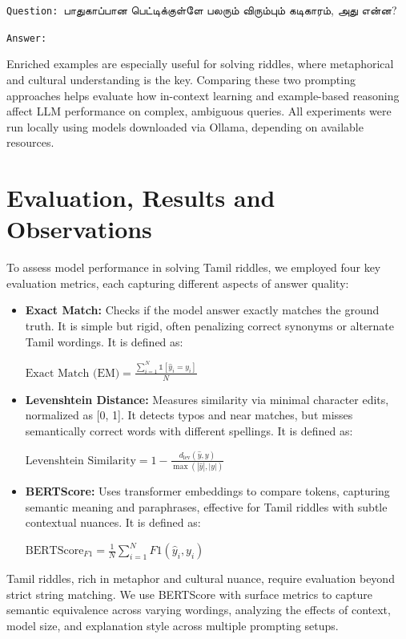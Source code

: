 \documentclass[11pt]{article}
\begin{document}
\texttt{Question: }{\tam பாதுகாப்பான பெட்டிக்குள்ளே பலரும்‌ விரும்பும்‌ கடிகாரம், அது என்ன?} 

\texttt{Answer:}

Enriched examples are especially useful for solving riddles, where metaphorical and cultural understanding is the key. Comparing these two prompting approaches helps evaluate how in-context learning and example-based reasoning affect LLM performance on complex, ambiguous queries. All experiments were run locally using models downloaded via Ollama, depending on available resources.

\section{Evaluation, Results and Observations}
To assess model performance in solving Tamil riddles, we employed four key evaluation metrics, each capturing different aspects of answer quality:

\begin{itemize}
\item \textbf{Exact Match:}  
Checks if the model answer exactly matches the ground truth. It is simple but rigid, often penalizing correct synonyms or alternate Tamil wordings.
It is defined as:

$\text{Exact Match (EM)} = \frac{\sum_{i=1}^{N} \mathbb{1}[\hat{y}_i = y_i]}{N}$

\item \textbf{Levenshtein Distance:}  
Measures similarity via minimal character edits, normalized as [0, 1]. It detects typos and near matches, but misses semantically correct words with different spellings.  
It is defined as:

$\text{Levenshtein Similarity} = 1 - \frac{d_{\text{lev}}(\hat{y}, y)}{\max(|\hat{y}|, |y|)}$

\item \textbf{BERTScore:}  
Uses transformer embeddings to compare tokens, capturing semantic meaning and paraphrases, effective for Tamil riddles with subtle contextual nuances.
It is defined as:

$\text{BERTScore}_{F1} = \frac{1}{N} \sum_{i=1}^{N} F1(\hat{y}_i, y_i)$
\end{itemize}

Tamil riddles, rich in metaphor and cultural nuance, require evaluation beyond strict string matching. We use BERTScore with surface metrics to capture semantic equivalence across varying wordings, analyzing the effects of context, model size, and explanation style across multiple prompting setups.
\end{document}
